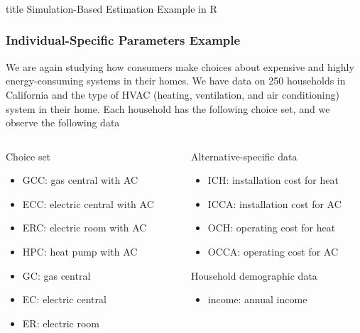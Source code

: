 \documentclass{beamer}\usepackage[]{graphicx}\usepackage[]{color}
\begin{document}
\begin{frame}\frametitle{}
    \vfill
    \centering
    \begin{beamercolorbox}[center]{title}
        \Large Simulation-Based Estimation Example in R
    \end{beamercolorbox}
    \vfill
\end{frame}

\begin{frame}\frametitle{Individual-Specific Parameters Example}
    We are again studying how consumers make choices about expensive and highly energy-consuming systems in their homes. We have data on 250 households in California and the type of HVAC (heating, ventilation, and air conditioning) system in their home. Each household has the following choice set, and we observe the following data \\
    \vspace{3ex}
    \begin{columns}
    	\begin{column}{0.5\textwidth}
		    Choice set
		    \begin{itemize}
		    	\item GCC: gas central with AC
		    	\item ECC: electric central with AC
		    	\item ERC: electric room with AC
		    	\item HPC: heat pump with AC
		    	\item GC: gas central
		    	\item EC: electric central
		    	\item ER: electric room
		    \end{itemize}
		    \vspace{2ex}
	    \end{column}
	    \begin{column}{0.5\textwidth}
		    Alternative-specific data
		    \begin{itemize}
		    	\item ICH: installation cost for heat
		    	\item ICCA: installation cost for AC
		    	\item OCH: operating cost for heat
		    	\item OCCA: operating cost for AC
		    \end{itemize}
		    \vspace{2ex}
		    Household demographic data
		    \begin{itemize}
		    	\item income: annual income
		    \end{itemize}
		\end{column}
    \end{columns}
\end{frame}
\end{document}
